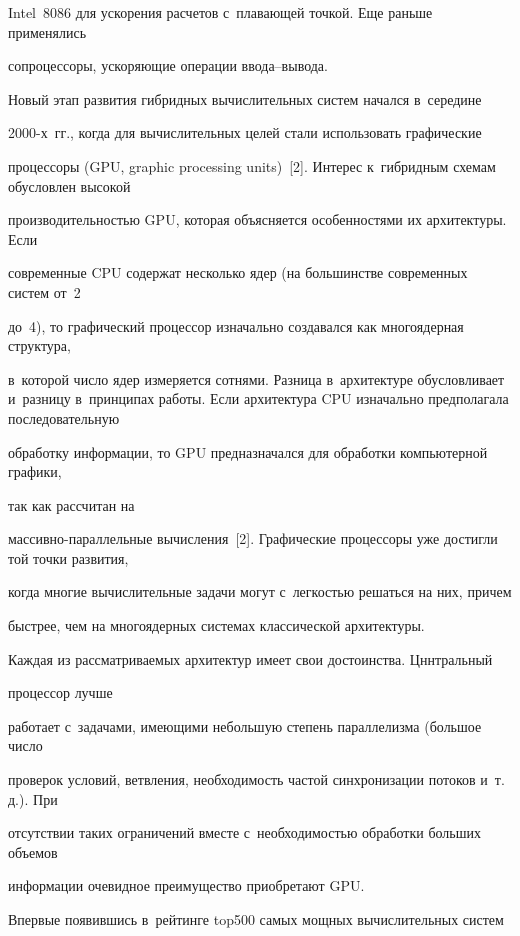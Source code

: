 Intel~8086 для ускорения расчетов с~плавающей точкой. Еще раньше применялись 

сопроцессоры, ускоряющие операции вво\-да--вы\-вода.

      

      Новый этап развития гибридных вычислительных систем начался в~середине  

2000-х~гг., когда для вычислительных целей стали использовать графические 

процессоры (GPU, graphic processing units)~[2]. Интерес к~гибридным схемам обусловлен высокой 

производительностью GPU, которая объясняется особенностями их архитектуры. Если 

современные CPU содержат несколько ядер (на большинстве современных систем от~2 

до~4), то графический процессор изначально создавался как многоядерная структура, 

в~которой число ядер измеряется сотнями. Разница в~архитектуре обусловливает и~разницу в~принципах работы. Если архитектура CPU изначально предполагала последовательную 

обработку информации, то GPU предназначался для обработки компьютерной графики, 

так как рассчитан на  

мас\-сив\-но-па\-рал\-лель\-ные вычисления~[2]. Графические процессоры уже достигли той точки развития, 

когда многие вычислительные задачи могут с~легкостью решаться на них, причем 

быстрее, чем на многоядерных системах классической архитектуры. 

      

      Каждая из рассматриваемых архитектур имеет свои достоинства. Цннтральный

      процессор лучше 

работает с~задачами, имеющими небольшую степень параллелизма (большое чис\-ло 

проверок условий, ветвления, необходимость частой синхронизации потоков и~т.\,д.). При 

отсутствии таких ограничений вместе с~необходимостью обработки больших объемов 

информации очевидное преимущество приобретают GPU.

      

      Впервые появившись в~рейтинге top500 самых мощных вычислительных сис\-тем 

